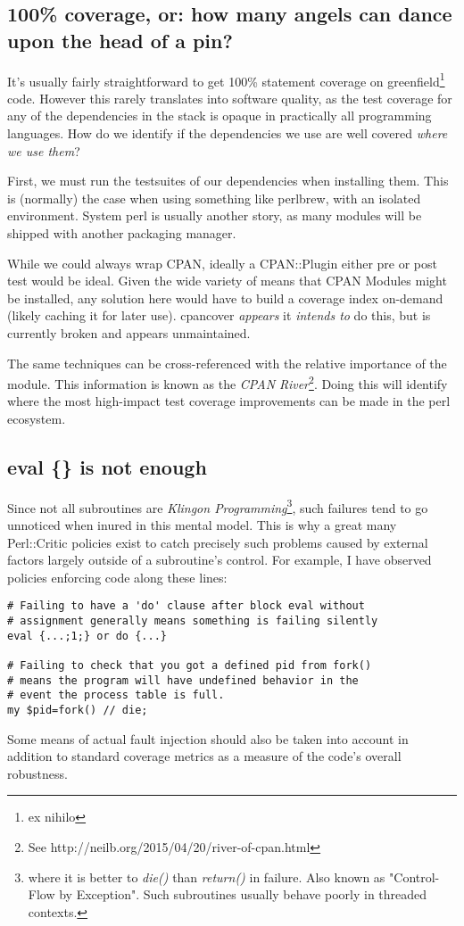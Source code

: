 \documentclass{article}
\begin{document}
\subsection{100\% coverage, or: how many angels can dance upon the head of a pin?}

It's usually fairly straightforward to get 100\% statement coverage on greenfield\footnote{ex nihilo} code.
However this rarely translates into software quality, as the test coverage for any of the dependencies in the stack is opaque in practically all programming languages.
How do we identify if the dependencies we use are well covered \textit{where we use them}?

First, we must run the testsuites of our dependencies when installing them.
This is (normally) the case when using something like perlbrew, with an isolated environment.
System perl is usually another story, as many modules will be shipped with another packaging manager.

While we could always wrap CPAN, ideally a CPAN::Plugin either pre or post test would be ideal.
Given the wide variety of means that CPAN Modules might be installed, any solution here would have to build a coverage index on-demand (likely caching it for later use).
cpancover \textit{appears} it \textit{intends to} do this, but is currently broken and appears unmaintained.

The same techniques can be cross-referenced with the relative importance of the module.
This information is known as the \textit{CPAN River}\footnote{See http://neilb.org/2015/04/20/river-of-cpan.html}.
Doing this will identify where the most high-impact test coverage improvements can be made in the perl ecosystem.

\subsection{eval \{\} is not enough}

Since not all subroutines are \textit{Klingon Programming}\footnote{where it is better to \textit{die()} than \textit{return()} in failure.  Also known as "Control-Flow by Exception".  Such subroutines usually behave poorly in threaded contexts.},
such failures tend to go unnoticed when inured in this mental model.
This is why a great many Perl::Critic policies exist to catch precisely such problems caused by external factors largely outside of a subroutine's control.
For example, I have observed policies enforcing code along these lines:
\begin{lstlisting}
# Failing to have a 'do' clause after block eval without
# assignment generally means something is failing silently
eval {...;1;} or do {...}

# Failing to check that you got a defined pid from fork()
# means the program will have undefined behavior in the
# event the process table is full.
my $pid=fork() // die;
\end{lstlisting}
Some means of actual fault injection should also be taken into account in addition to standard coverage metrics as a measure of the code's overall robustness.
\end{document}

